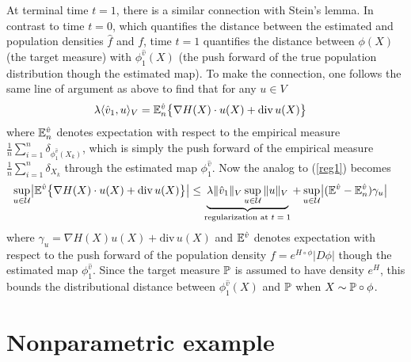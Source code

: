 \documentclass[noinfoline]{imsart}
\begin{document}
 At terminal time $t=1$, there is a similar connection with Stein's lemma. In contrast to time $t=0$, which quantifies the distance between the estimated  and population densities $\hat f$ and $f$,  time $t=1$ quantifies the distance between $\phi(X)$ (the target measure) with $\phi_1^{\hat v}(X)$ (the push forward of the true population distribution though the estimated map).  To make the connection, one follows  the same line of argument as above to  find that  for any $u\in V$
\begin{align}
\lambda \langle \hat v_1, u\rangle_V &=  {\Bbb E}^{\hat v}_n\bigl\{ \nabla H(X)\cdot u(X ) + \text{div}\, u(X)\bigr\} \label{stein}
\end{align}
where ${\Bbb E}^{\hat v}_n$ denotes  expectation with respect to the empirical measure $\frac{1}{n}\sum_{i=1}^n \delta_{\phi^{\hat v}_1(X_k)}$, which is simply the push forward of the empirical measure $\frac{1}{n}\sum_{i=1}^n \delta_{X_k}$ through the estimated map $\phi^{\hat v}_1$.
Now the analog to (\ref{reg1})  becomes
   \begin{align}
   \label{reg2}
    \sup_{u\in \mathcal U} \bigl| {\Bbb E^{\hat v}}\bigl\{ \nabla H(X)\cdot  u(X) + \text{div}\, u(X)\bigr\} \bigr|   &\leq \underbrace{ \lambda \| \hat v_1\|_V  \sup_{u\in \mathcal U} \|  u \|_V }_\text{regularization at $t=1$} +\, {\sup_{u\in \mathcal U} \bigl| (\Bbb E^{\hat v} -\Bbb E_n^{\hat v}) \gamma_{u}\bigr|}
 \end{align}
 where $\gamma_{u} = \nabla H(X) u(X) + \text{div}\, u(X)$ and $\Bbb E^{\hat v}$ denotes expectation with respect to the push forward of the population density $f =    e^{ H\circ \phi} |D\phi| $ though the estimated map $\phi_1^{\hat v}$.  
Since the target measure $\Bbb P$ is assumed to have density $e^H$, this bounds the distributional distance between $\phi^{\hat v}_1(X)$ and $\Bbb P$ when $X\sim \Bbb P\circ \phi$. 



\section{Nonparametric example}
\label{npe}
\end{document}

